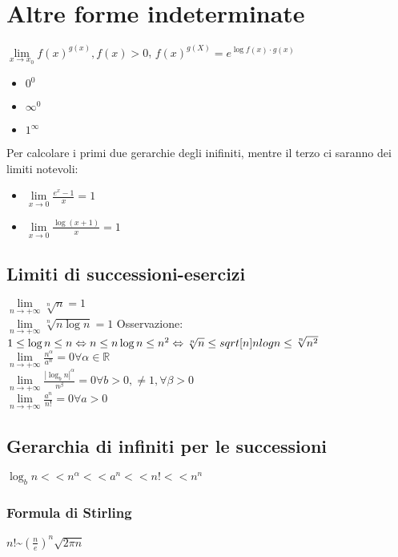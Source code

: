 \section{Altre forme indeterminate}
$\lim\limits_{x\rightarrow x_0} f(x)^{g(x)}, f(x)>0$, $f(x)^{g(X)}=e^{\log f(x)\cdot g(x)}$
\begin{itemize}
\item $0^0$
\item $\infty^0$
\item $1^\infty$
\end{itemize}
Per calcolare i primi due gerarchie degli inifiniti, mentre il terzo ci saranno dei limiti notevoli:
\begin{itemize}
\item $\lim\limits_{x\rightarrow 0}\frac{e^x-1}{x}=1$
\item $\lim\limits_{x\rightarrow 0}\frac{\log (x+1)}{x}=1$
\end{itemize}
\subsection{Limiti di successioni-esercizi}
$\lim\limits_{n\rightarrow +\infty}\sqrt[n]{n}=1$\\
$\lim\limits_{n\rightarrow +\infty}\sqrt[n]{n\log n}=1$ Osservazione: $1\le\log n\le n\Leftrightarrow n\le n\log n\le n^2\Leftrightarrow \sqrt[n]{n}\le\\sqrt[n]{nlog n} \le \sqrt[n]
{n^2}$\\
$\lim\limits_{n\rightarrow +\infty}\frac{n^\alpha}{a^n}=0\forall\alpha\in\mathbb{R}$\\
$\lim\limits_{n\rightarrow +\infty}\frac{{|\log_b n|}^{\alpha}}{n^{\beta}}=0\forall b>0,\neq 1,\forall\beta>0$\\
$\lim\limits_{n\rightarrow +\infty}\frac{a^n}{n!}=0\forall a>0$
\subsection{Gerarchia di infiniti per le successioni}
$\log_b n <<n^\alpha<<a^n<<n!<<n^n$
\subsubsection{Formula di Stirling}
$n!$\textasciitilde$(\frac{n}{e})^n\sqrt{2\pi n}$

